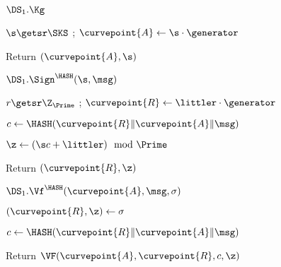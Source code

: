 \begin{figure}
{
  \begin{algorithm-initial}{$\DS_1.\Kg$}
  \item $\s \getsr \SKS$ ; $\curvepoint{A} \gets \s\cdot \generator$
  \item Return $(\curvepoint{A},\s)$
  \end{algorithm-initial}
\begin{algorithm-subsequent}{$\DS_1.\Sign^{\HASH}(\s, \msg)$}
\item $r \getsr \Z_{\Prime}$ ; $\curvepoint{R} \gets \littler\cdot \generator$
\item $c \gets \HASH(\curvepoint{R}\|\curvepoint{A}\| \msg)$
\item $\z \gets (\s c + \littler) \mod \Prime$
\item Return $(\curvepoint{R}, \z)$
  \end{algorithm-subsequent}
  \begin{algorithm-subsequent}{$\DS_1.\Vf^{\HASH}(\curvepoint{A}, \msg, \sigma)$}
  \item $(\curvepoint{R}, \z) \gets \sigma$
  \item  $c \gets \HASH(\curvepoint{R}\|\curvepoint{A}\| \msg)$
  \item Return $\VF(\curvepoint{A},\curvepoint{R},c,\z)$
  \end{algorithm-subsequent}  \vspace{2pt}
 }
 {
}
\end{figure}
